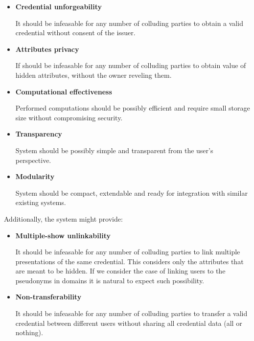 \begin{itemize}
    \item \textbf{Credential unforgeability}
    
    It should be infeasable for any number of colluding parties to obtain a valid credential without consent of the issuer.
    \item \textbf{Attributes privacy} 
    
    If should be infeasable for any number of colluding parties to obtain value of hidden attributes, without the owner reveling them.
    \item \textbf{Computational effectiveness}
    
    Performed computations should be possibly efficient and require small storage size without compromising security.
    \item \textbf{Transparency}
    
    System should be possibly simple and transparent from the user's perspective.
    \item \textbf{Modularity}
    
    System should be compact, extendable and ready for integration with similar existing systems.
\end{itemize}
Additionally, the system might provide:
\begin{itemize}
    \item \textbf{Multiple-show unlinkability}
    
    It should be infeasable for any number of colluding parties to link multiple presentations of the same credential. This considers only the attributes that are meant to be hidden. If we consider the case of linking users to the pseudonyms in domains it is natural to expect such possibility.
    
    \item \textbf{Non-transferability}
    
    It should be infeasable for any number of colluding parties to transfer a valid credential between different users without sharing all credential data (all or nothing).
\end{itemize}



